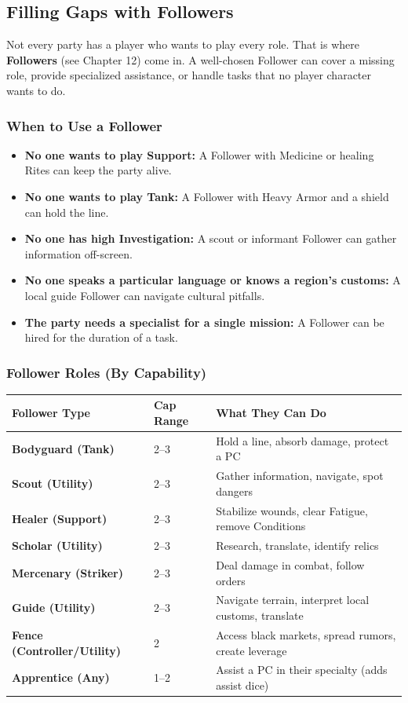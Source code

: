 \subsection{Filling Gaps with Followers}

Not every party has a player who wants to play every role. That is where \textbf{Followers} (see Chapter 12) come in. A well-chosen Follower can cover a missing role, provide specialized assistance, or handle tasks that no player character wants to do.

\subsubsection{When to Use a Follower}

\begin{itemize}
  \item \textbf{No one wants to play Support:} A Follower with Medicine or healing Rites can keep the party alive.
  \item \textbf{No one wants to play Tank:} A Follower with Heavy Armor and a shield can hold the line.
  \item \textbf{No one has high Investigation:} A scout or informant Follower can gather information off-screen.
  \item \textbf{No one speaks a particular language or knows a region's customs:} A local guide Follower can navigate cultural pitfalls.
  \item \textbf{The party needs a specialist for a single mission:} A Follower can be hired for the duration of a task.
\end{itemize}

\subsubsection{Follower Roles (By Capability)}

\begin{center}
\begin{tabular}{p{3.5cm}|p{3cm}|p{4cm}}
\toprule
\textbf{Follower Type} & \textbf{Cap Range} & \textbf{What They Can Do} \\
\midrule
\textbf{Bodyguard (Tank)} & 2--3 & Hold a line, absorb damage, protect a PC \\
\textbf{Scout (Utility)} & 2--3 & Gather information, navigate, spot dangers \\
\textbf{Healer (Support)} & 2--3 & Stabilize wounds, clear Fatigue, remove Conditions \\
\textbf{Scholar (Utility)} & 2--3 & Research, translate, identify relics \\
\textbf{Mercenary (Striker)} & 2--3 & Deal damage in combat, follow orders \\
\textbf{Guide (Utility)} & 2--3 & Navigate terrain, interpret local customs, translate \\
\textbf{Fence (Controller/Utility)} & 2 & Access black markets, spread rumors, create leverage \\
\textbf{Apprentice (Any)} & 1--2 & Assist a PC in their specialty (adds assist dice) \\
\bottomrule
\end{tabular}
\end{center}

